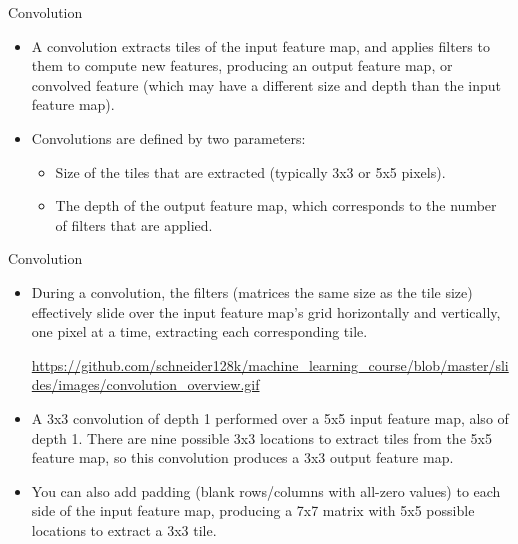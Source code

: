 \documentclass{beamer}
\begin{document}
\begin{frame}{Convolution}
\begin{itemize}
\item A convolution extracts tiles of the input feature map, and applies filters to them to compute new features, producing an output feature map, or convolved feature (which may have a different size and depth than the input feature map). 
\item Convolutions are defined by two parameters:
\begin{itemize}
\item Size of the tiles that are extracted (typically 3x3 or 5x5 pixels).
\item The depth of the output feature map, which corresponds to the number of filters that are applied.
\end{itemize}
\end{itemize}
\end{frame}

\begin{frame}{Convolution}
\begin{itemize}
\item During a convolution, the filters (matrices the same size as the tile size) effectively slide over the input feature map's grid horizontally and vertically, one pixel at a time, extracting each corresponding tile.

{\tiny
\url{https://github.com/schneider128k/machine_learning_course/blob/master/slides/images/convolution_overview.gif}}

\item A 3x3 convolution of depth 1 performed over a 5x5 input feature map, also of depth 1. There are nine possible 3x3 locations to extract tiles from the 5x5 feature map, so this convolution produces a 3x3 output feature map.

\item You can also add padding (blank rows/columns with all-zero values) to each side of the input feature map, producing a 7x7 matrix with 5x5 possible locations to extract a 3x3 tile.
\end{itemize}
\end{frame}
\end{document}
